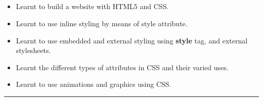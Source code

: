 \documentclass[12pt,letterpaper]{article}
\begin{document}
\subsection*{}
\renewcommand{\labelitemi}{$\textendash$}
\begin{itemize}
    \item Learnt to build a website with HTML5 and CSS.
    \item Learnt to use inline styling by means of style attribute.
    \item Learnt to use embedded and external styling using \textbf{style} tag, and external stylesheets.
    \item Learnt the different types of attributes in CSS and their varied uses.
    \item Learnt to use animations and graphics using CSS.
\end{itemize}
\hrule
\end{document}
